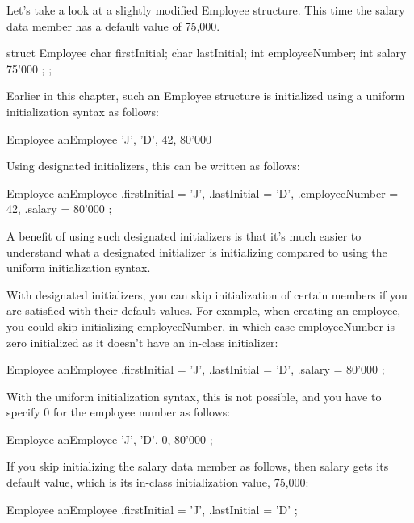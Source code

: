 Let’s take a look at a slightly modified Employee structure. This time the salary data member has a default value of 75,000.

\begin{cpp}
struct Employee {
    char firstInitial;
    char lastInitial;
    int employeeNumber;
    int salary { 75'000 };
};
\end{cpp}

Earlier in this chapter, such an Employee structure is initialized using a uniform initialization syntax as follows:

\begin{cpp}
Employee anEmployee { 'J', 'D', 42, 80'000 }
\end{cpp}

Using designated initializers, this can be written as follows:

\begin{cpp}
Employee anEmployee {
    .firstInitial = 'J',
    .lastInitial = 'D',
    .employeeNumber = 42,
    .salary = 80'000
};
\end{cpp}

A benefit of using such designated initializers is that it’s much easier to understand what a designated initializer is initializing compared to using the uniform initialization syntax.

With designated initializers, you can skip initialization of certain members if you are satisfied with their default values. For example, when creating an employee, you could skip initializing employeeNumber, in which case employeeNumber is zero initialized as it doesn’t have an in-class initializer:

\begin{cpp}
Employee anEmployee {
    .firstInitial = 'J',
    .lastInitial = 'D',
    .salary = 80'000
};
\end{cpp}

With the uniform initialization syntax, this is not possible, and you have to specify 0 for the employee number as follows:

\begin{cpp}
Employee anEmployee { 'J', 'D', 0, 80'000 };
\end{cpp}

If you skip initializing the salary data member as follows, then salary gets its default value, which is its in-class initialization value, 75,000:

\begin{cpp}
Employee anEmployee {
    .firstInitial = 'J',
    .lastInitial = 'D'
};
\end{cpp}


